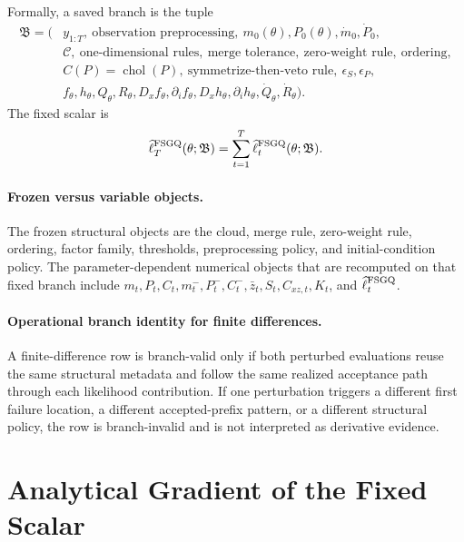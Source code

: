 \documentclass[11pt]{article}
\numberwithin{equation}{section}
\newcommand{\chol}{\operatorname{chol}}
\newcommand{\ellhat}{\widehat\ell}
\newcommand{\branch}{\mathfrak B}
\begin{document}
Formally, a saved branch is the tuple
\begin{equation}
\begin{aligned}
  \branch
  =
  (&y_{1:T},\ \text{observation preprocessing},\ m_0(\theta),P_0(\theta),\dot m_0,\dot P_0,\\
  &\mathcal C,\ \text{one-dimensional rules},\ \text{merge tolerance},\ \text{zero-weight rule},\ \text{ordering},\\
  &C(P)=\chol(P),\ \text{symmetrize-then-veto rule},\ \epsilon_S,\epsilon_P,\\
  &f_\theta,h_\theta,Q_\theta,R_\theta,
  D_xf_\theta,\partial_i f_\theta,D_xh_\theta,\partial_i h_\theta,
  \dot Q_\theta,\dot R_\theta).
\end{aligned}
\label{eq:branch-tuple}
\end{equation}
The fixed scalar is
\begin{equation}
  \ellhat_T^{\rm FSGQ}(\theta;\branch)
  =
  \sum_{t=1}^T \ellhat_t^{\rm FSGQ}(\theta;\branch).
  \label{eq:fixed-scalar-branch}
\end{equation}

\paragraph{Frozen versus variable objects.}
The frozen structural objects are the cloud, merge rule, zero-weight rule,
ordering, factor family, thresholds, preprocessing policy, and
initial-condition policy.  The parameter-dependent numerical objects that are
recomputed on that fixed branch include
\(m_t,P_t,C_t,m_t^-,P_t^-,C_t^-,\bar z_t,S_t,C_{xz,t},K_t\), and
\(\ellhat_t^{\rm FSGQ}\).

\paragraph{Operational branch identity for finite differences.}
A finite-difference row is branch-valid only if both perturbed evaluations reuse
the same structural metadata and follow the same realized acceptance path through
each likelihood contribution.  If one perturbation triggers a different first
failure location, a different accepted-prefix pattern, or a different structural
policy, the row is branch-invalid and is not interpreted as derivative evidence.

\section{Analytical Gradient of the Fixed Scalar}
\label{sec:gradient}
\end{document}
